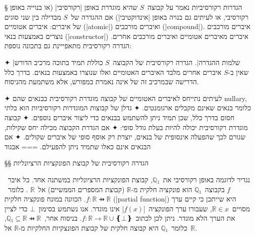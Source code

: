 \def\Title{רקע מתימטי ויתאורטי}


§ הגדרות רקורסיביות
נאמר על קבוצה~$S$ שהיא מוגדרת באופן \ע|רקורסיבי| (או בנוייה באופן רקורסיבי, או
לעיתים גם בנויה באופן \ע|אינדוקטיבי|) אם ההגדרה של~$S$ מבדילה בין שני סוגים של
איברים: איברים אטומיים (\E|atomic|) ואיברים מורכבים (\E|compound|). איברים
מורכבים נוצרים באמצעות בנאי (\E|constructor|) איברים מאיברים אטומיים ואיברים
מורכבים אחרים. הגדרה רקורסיבית מתאפייינת גם בתכונה נוספת: 
\begin{itemize}
  ✦ \ע|שלמות ההגדרה|. הגדרה רקורסיבית של הקבוצה~$S$ כוללת תמיד בתוכה מרכיב
  הדורש שאין ב-$S$ איברים אחרים מלבד האיברים האטומיים ואלו שנוצרו באמצעות בנאים.
  בדרך כלל הדרישה שבמרכיב זה של אינה נאמרת במפורש, אלא משתמעת מהניסוח.
  \end{itemize}

✦ לעיתים נתייחס לאיברים האטומיים של קבוצה מוגדרת רקורסיבית כבנאים שהם nullary,
כלומר בנאים שאינם מקבלים ארגומנטים.
✦ גדלן של קבוצות המוגדרות רקורסיביות הוא בלתי חסום בדרך כלל, שכן תמיד ניתן
להשתמש בבנאים כדי ליצור איברים נוספים.
✦ קבוצה מוגדרת רקורסיבית יכולה להיות בעלת גודל סופי:
✦ אם הגדרת הקבוצה מכילה יחס שקילות, שגורם לכך שהפעלה אינסופית של בנאים, יוצרת
רק אוסף סופי של איברים שקולים.
✦ אם הבנאים אינם כאלו שתמיד ניתן להפעילם.
===
{אבגוד}

§§ הגדרה רקורסיבית של קבוצת הפונקציות הרציונליות

נגדיר לדוגמה באופן רקורסיבי את~$ℚ₁$, קבוצת הפונקציות הרציונליות במשתנה אחד. כל
איבר~$f$ בקבוצה~$ℚ₁$ הוא פונקציה חלקית מ-$ℝ$ (קבוצת המספרים הממשיים) אל~$ℝ$ .
כלומר~$f:ℝ⇸ℝ$. הכוונה במונח פונקציה חלקית (\E|partial function|) היא שייתכן כי
קיים ערך מסויים~$ℝ∈x$, שעבורו ערך הפונקציה~\E|$f(x)$| אינו מוגדר. אנו נשתמש
בסימון~$⊥$ כדי לציין את הערך הלא מוגדר. ניתן לכן לכתוב~$f:ℝ→ℝ∪❴⊥❵$. בניסוח
אחר,~$ℚ₁⊆ℝ⇸ℝ$, כלומר~$ℚ₁$ היא קבוצה חלקית של קבוצת הפונצקיות החלקיות מ-$ℝ$
אל~$ℝ$.

